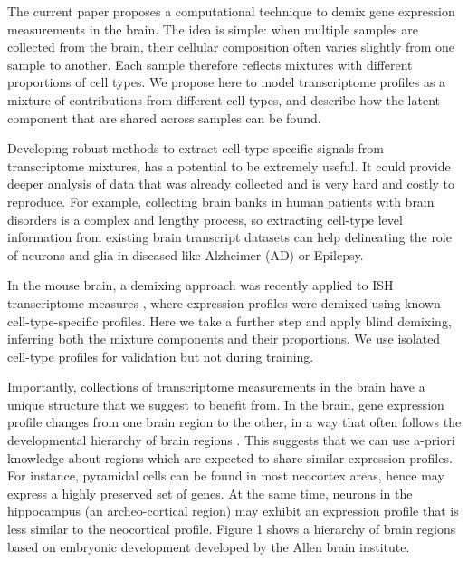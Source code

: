\documentclass{article} %
\begin{document}
The current paper proposes a computational technique to demix gene expression measurements in the brain. The idea is simple: when multiple samples are collected from the brain, their cellular composition often varies slightly from one sample to another. Each sample therefore reflects mixtures with different proportions of cell types. We propose here to model transcriptome profiles as a mixture of contributions from different cell types, and describe how the latent component that are shared across samples can be found.

Developing robust methods to extract cell-type specific signals from transcriptome mixtures, has a potential to be extremely useful. It could provide deeper analysis of data that was already collected and is very hard and costly to reproduce. For example, collecting brain banks in human patients with brain disorders is a complex and lengthy process, so extracting cell-type level information from existing brain transcript datasets can help delineating the role of neurons and glia in diseased like Alzheimer (AD) or Epilepsy.

In the mouse brain, a demixing approach was recently applied to ISH transcriptome measures \cite{grange2014cell}, where expression profiles were demixed using known cell-type-specific profiles. Here we take a further step and apply blind demixing, inferring both the mixture components and their proportions. We use isolated cell-type profiles for validation but not during training. 


Importantly, collections of transcriptome measurements in the brain have a unique structure that we suggest to benefit from. In the brain, gene expression profile changes from one brain region to the other, in a way that often follows the developmental hierarchy of brain regions \cite{zapala2005}. This suggests that we can use a-priori knowledge about regions which are expected to share similar expression profiles. For instance, pyramidal cells can be found in most neocortex areas, hence may express a highly preserved set of genes. At the same time, neurons in the hippocampus (an archeo-cortical region) may exhibit an expression profile that is less similar to the neocortical profile. Figure 1 shows a hierarchy of brain regions based on embryonic development developed by the Allen brain institute. 
\end{document}

